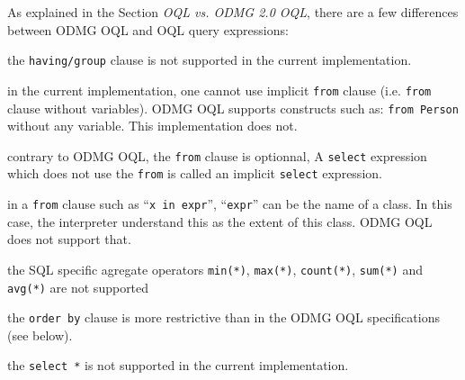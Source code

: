 As explained in the Section \emph{OQL vs. ODMG 2.0 OQL},
there are a few differences between ODMG OQL and \eyedb OQL query expressions:
\bi
\item the \texttt{having/group} clause is not
supported in the current implementation.
\item in the current implementation,
one cannot use implicit \texttt{from} clause (i.e. \texttt{from}
clause without variables). ODMG OQL supports constructs such as:
\texttt{from Person} without any variable. This implementation does not.
\item contrary to ODMG OQL, the \texttt{from} clause is optionnal,
A \texttt{select} expression which does not use the \texttt{from} is
called an implicit \texttt{select} expression.
\item in a \texttt{from} clause such as ``\texttt{x in expr}'', ``\texttt{expr}'' can
be the name of a class. In this case, the interpreter understand
this as the extent of this class. ODMG OQL does not support that.
\item the SQL specific agregate operators \texttt{min(*)},
\texttt{max(*)}, \texttt{count(*)}, \texttt{sum(*)} and \texttt{avg(*)}
are not supported
\item the \texttt{order by} clause is more restrictive than
in the ODMG OQL specifications (see below).
\item the \texttt{select *} is not supported in the current implementation.
\ei


